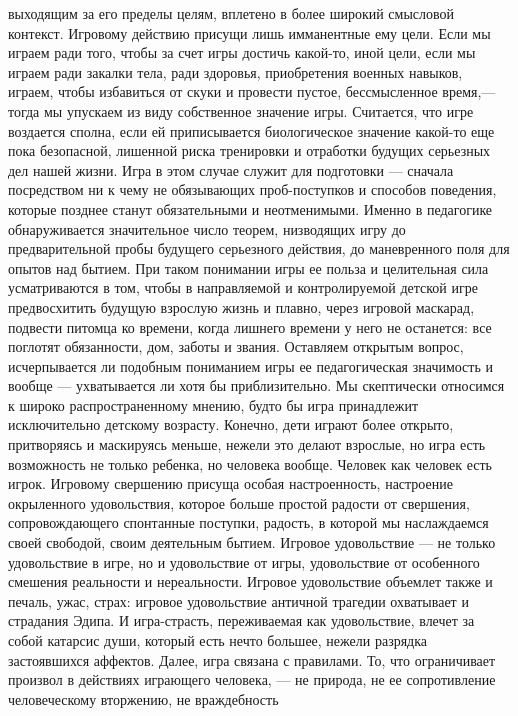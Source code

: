 \documentclass[12pt]{article}
\begin{document}
выходящим за его пределы целям, вплетено в более широкий смысловой контекст. Игровому действию присущи
лишь имманентные ему цели. Если мы играем ради того, чтобы за счет игры достичь какой-то, иной цели, если
мы играем ради закалки тела, ради здоровья, приобретения военных навыков, играем, чтобы избавиться от
скуки и провести пустое, бессмысленное время,--- тогда мы упускаем из виду собственное значение игры.
Считается,  что  игре  воздается  сполна,  если  ей  приписывается  биологическое  значение  какой-то  еще  пока
безопасной, лишенной риска тренировки и отработки будущих серьезных дел нашей жизни. Игра в этом случае
служит  для  подготовки  ---  сначала  посредством  ни  к  чему  не  обязывающих  проб-поступков  и  способов
поведения, которые позднее станут обязательными и неотменимыми. Именно в педагогике обнаруживается
значительное число теорем, низводящих игру до предварительной пробы будущего серьезного действия, до
маневренного  поля  для  опытов  над  бытием.  При  таком  понимании  игры  ее  польза  и  целительная  сила
усматриваются в том, чтобы в направляемой и контролируемой детской игре предвосхитить будущую взрослую
жизнь и плавно, через игровой маскарад, подвести питомца ко времени, когда лишнего времени у него не
останется: все поглотят обязанности, дом, заботы и звания. Оставляем открытым вопрос, исчерпывается ли
подобным  пониманием  игры  ее  педагогическая  значимость  и  вообще  ---  ухватывается  ли  хотя  бы
приблизительно. Мы скептически относимся к широко распространенному мнению, будто бы игра принадлежит
исключительно детскому возрасту. Конечно, дети играют более открыто, притворяясь и маскируясь меньше,
нежели это делают взрослые, но игра есть возможность не только ребенка, но человека вообще. Человек как
человек  есть  игрок.  Игровому  свершению  присуща  особая  настроенность,  настроение  окрыленного
удовольствия,  которое  больше  простой  радости  от  свершения,  сопровождающего  спонтанные  поступки,
радость, в которой мы наслаждаемся своей свободой, своим деятельным бытием. Игровое удовольствие --- не
только удовольствие в игре, но и удовольствие от игры, удовольствие от особенного смешения реальности и
нереальности. Игровое удовольствие объемлет также и печаль, ужас, страх: игровое удовольствие античной
трагедии  охватывает  и  страдания  Эдипа.  И  игра-страсть,  переживаемая  как  удовольствие,  влечет  за  собой
катарсис души, который есть нечто большее,
 нежели разрядка застоявшихся аффектов. Далее, игра связана с правилами. То, что ограничивает произвол в
действиях играющего человека, --- не природа, не ее сопротивление человеческому вторжению, не враждебность
\end{document}
